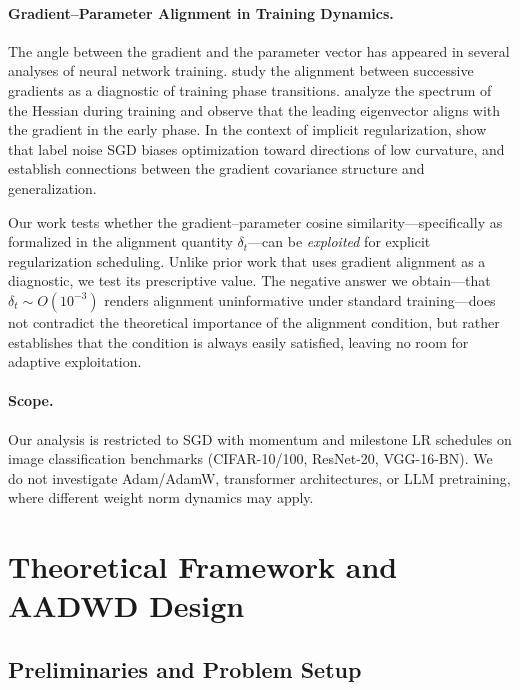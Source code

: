 \documentclass{article}
\begin{document}
\paragraph{Gradient--Parameter Alignment in Training Dynamics.}
The angle between the gradient and the parameter vector has appeared in several
analyses of neural network training.
\citet{fort2019emergent} study the alignment between successive gradients as a
diagnostic of training phase transitions.
\citet{gur2018gradient} analyze the spectrum of the Hessian during training and
observe that the leading eigenvector aligns with the gradient in the early phase.
In the context of implicit regularization, \citet{blanc2020implicit} show that label
noise SGD biases optimization toward directions of low curvature, and
\citet{li2021happens} establish connections between the gradient covariance structure
and generalization.

Our work tests whether the gradient--parameter cosine similarity---specifically as
formalized in the alignment quantity $\delta_t$---can be \emph{exploited} for
explicit regularization scheduling.
Unlike prior work that uses gradient alignment as a diagnostic, we test its
prescriptive value.
The negative answer we obtain---that $\delta_t \sim O(10^{-3})$ renders alignment
uninformative under standard training---does not contradict the theoretical importance
of the alignment condition, but rather establishes that the condition is always
easily satisfied, leaving no room for adaptive exploitation.

\paragraph{Scope.}
Our analysis is restricted to SGD with momentum and milestone LR schedules on image
classification benchmarks (CIFAR-10/100, ResNet-20, VGG-16-BN).
We do not investigate Adam/AdamW, transformer architectures, or LLM pretraining,
where different weight norm dynamics may apply.

\section{Theoretical Framework and AADWD Design}
\label{sec:theory}

\subsection{Preliminaries and Problem Setup}
\label{sec:prelim}
\end{document}
